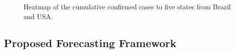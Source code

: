 \begin{figure}[htb!]
    \centering
    
    \caption{Heatmap of the cumulative confirmed cases to five states from Brazil and USA.}
    \label{fig:heatmap}
\end{figure}


\subsection{Proposed Forecasting Framework}

